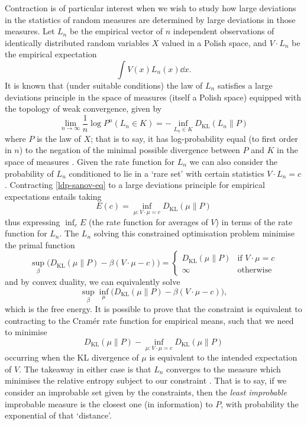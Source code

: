 \documentclass[11pt]{amsart}
\numberwithin{equation}{section}
\theoremstyle{remark}
\theoremstyle{remark}
\begin{document}
Contraction is of particular interest when we wish to study how large deviations in the statistics of random measures are determined by large deviations in those measures. Let $L_n$ be the empirical vector of $n$ independent observations of identically distributed random variables $X$ valued in a Polish space, and $V \cdot L_n$ be the empirical expectation
\[
    \int V(x) L_n(x) \dd x.
\]
It is known that (under suitable conditions) the law of $L_n$ satisfies a large deviations principle in the space of measures (itself a Polish space) equipped with the topology of weak convergence, given by
\begin{equation}\label{ldp-sanov-eq}
    \lim_{n\to\infty} \frac{1}{n} \log P^n(L_n \in K) = -\inf_{L_n \in K} D_{\mathrm{KL}}(L_n \| P)
\end{equation}
where $P$ is the law of $X$; that is to say, it has log-probability equal (to first order in $n$) to the negation of the minimal possible divergence between $P$ and $K$ in the space of measures \cite{sanov}. Given the rate function for $L_n$ we can also consider the probability of $L_n$ conditioned to lie in a `rare set' with certain statistics $V \cdot L_n = c$. Contracting \eqref{ldp-sanov-eq} to a large deviations principle for empirical expectations entails taking
\[
    E(c) = \inf_{\mu : V\cdot \mu = c} D_{\mathrm{KL}}(\mu \| P)
\]
thus expressing $\inf_c E$ (the rate function for averages of $V$) in terms of the rate function for $L_n$. The $L_n$ solving this constrained optimisation problem minimise the primal function 
\begin{equation}\label{global-rate-eq}
\sup_\beta \big( D_{\mathrm{KL}}(\mu \| P) - \beta(V\cdot \mu - c) \big) = 
    \begin{cases}
        D_{\mathrm{KL}}(\mu \| P) & \text{if } V \cdot \mu = c\\
        \infty & \text{otherwise}
    \end{cases}
\end{equation}
and by convex duality, we can equivalently solve
\[
    \sup_\beta \inf_\mu\big( D_{\mathrm{KL}}(\mu \| P) - \beta(V\cdot \mu - c) \big),
\]
which is the free energy. It is possible to prove that the constraint is equivalent to contracting to the Cram\'er rate function for empirical means, such that we need to minimise
\[
D_{\mathrm{KL}}(\mu \| P) - \inf_{\mu : V\cdot \mu = c} D_{\mathrm{KL}}(\mu \| P)
\]
occurring when the KL divergence of $\mu$ is equivalent to the intended expectation of $V$. The takeaway in either case is that $L_n$ converges to the measure which minimises the relative entropy subject to our constraint \cite{csiszar}. That is to say, if we consider an improbable set given by the constraints, then the {\it least improbable} improbable measure is the closest one (in information) to $P$, with probability the exponential of that `distance'.
\end{document}
